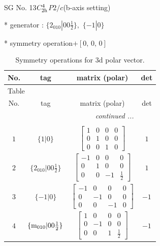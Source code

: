 \documentclass[fleqn,8pt]{jsarticle}
\begin{document}
\setcounter{MaxMatrixCols}{32}

\renewcommand{\tablename}{Table~}
\renewcommand{\figurename}{Figure~}
\begin{center}
\LARGE
SG No. 13\quad$C_{\rm 2h}^{4}$\quad$P2/c$\quad(b-axis setting)\quad[ monoclinic ]
\end{center}

* generator : $\{2{}_{010}|0 0 \frac{1}{2}\},\,\,\{-1|0\}$

* symmetry operation\quad$+\left[ 0,\, 0,\, 0 \right]$
\renewcommand{\arraystretch}{1.3}
\begin{longtable}{cccc}
\caption{Symmetry operations for 3d polar vector.}
 \\
 \hline \hline
No. & tag & matrix (polar) & det \\ \hline \endfirsthead

\multicolumn{3}{l}{\tablename\ \thetable{}} \\
 \hline \hline
No. & tag & matrix (polar) & det \\ \hline \endhead

 \hline \hline
\multicolumn{3}{r}{\footnotesize\it continued ...} \\ \endfoot

 \hline \hline
\multicolumn{3}{r}{} \\ \endlastfoot

$ 1 $ & $ \{1|0\} $ & $ \begin{bmatrix} 1 & 0 & 0 & 0 \\ 0 & 1 & 0 & 0 \\ 0 & 0 & 1 & 0 \end{bmatrix} $ & $ 1 $ \\ \hline
$ 2 $ & $ \{2{}_{010}|0 0 \frac{1}{2}\} $ & $ \begin{bmatrix} -1 & 0 & 0 & 0 \\ 0 & 1 & 0 & 0 \\ 0 & 0 & -1 & \frac{1}{2} \end{bmatrix} $ & $ 1 $ \\ \hline
$ 3 $ & $ \{-1|0\} $ & $ \begin{bmatrix} -1 & 0 & 0 & 0 \\ 0 & -1 & 0 & 0 \\ 0 & 0 & -1 & 0 \end{bmatrix} $ & $ -1 $ \\ \hline
$ 4 $ & $ \{{\rm m}_{010}|0 0 \frac{1}{2}\} $ & $ \begin{bmatrix} 1 & 0 & 0 & 0 \\ 0 & -1 & 0 & 0 \\ 0 & 0 & 1 & \frac{1}{2} \end{bmatrix} $ & $ -1 $ \\
\end{longtable}
\end{document}
